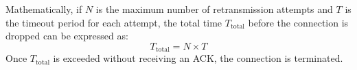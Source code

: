 Mathematically, if \( N \) is the maximum number of retransmission attempts and \( T \) is the timeout period for each attempt, the total time \( T_{\text{total}} \) before the connection is dropped can be expressed as:
\[
T_{\text{total}} = N \times T
\]
Once \( T_{\text{total}} \) is exceeded without receiving an ACK, the connection is terminated.

